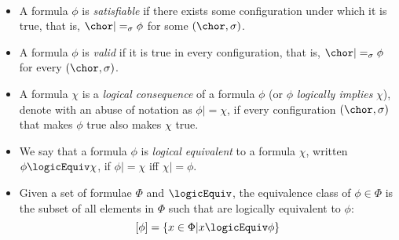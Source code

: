 \begin{definition}\
  \begin{itemize}
  \item A formula $\phi$ is \emph{satisfiable} if there exists some
    configuration under which it is true, that is, $\chor |=_\sigma
    \phi$ for some $(\chor,\sigma)$.
  \item A formula $\phi$ is \emph{valid} if it is true in every
    configuration, that is, $\chor |=_\sigma \phi$ for every
    $(\chor, \sigma)$.
  \item A formula $\chi$ is a \emph{logical consequence} of a formula
    $\phi$ (or $\phi$ \emph{logically implies} $\chi$), denote with
    an abuse of notation as $\phi |= \chi$, if every configuration
    $(\chor,\sigma)$ that makes $\phi$ true also makes $\chi$ true.
  \item We say that a formula $\phi$ is \emph{logical equivalent} to
    a formula $\chi$, written $\phi \logicEquiv \chi$, if $\phi |= \chi$ iff
    $\chi |= \phi$.
    \item Given a set of formulae $\Phi$ and $\logicEquiv$, the
      equivalence class of $\phi \in \Phi$ is the subset of all
      elements in $\Phi$ such that are logically equivalent to $\phi$:
      \[
      [ \phi ] = \{ x \in \Phi | x \logicEquiv \phi \}
      \]
  \end{itemize}
\end{definition}

%
%


